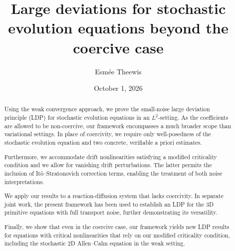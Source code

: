\documentclass{amsart}
\newcommand{\<}{\langle}
\newcommand{\?}{\rangle}
\theoremstyle{plain}
\theoremstyle{remark}
\theoremstyle{plain}
\numberwithin{equation}{section}
\begin{document}
\author[Esm\'ee Theewis]{Esm\'ee Theewis}
\address[E. Theewis]{Delft Institute of Applied Mathematics\\
Delft University of Technology \\ P.O. Box 5031\\ 2600 GA Delft\\The
Netherlands}


\date{October 1, 2026}

\title[Large deviations beyond the coercive case]{Large deviations for stochastic evolution equations beyond the coercive case}  




\begin{abstract} 
Using the weak convergence approach, we prove the small-noise large deviation principle (LDP) for stochastic evolution equations in an $L^2$-setting. As the coefficients are allowed to be non-coercive, our framework encompasses a much broader scope than variational settings. In place of coercivity, we require only well-posedness of the stochastic evolution equation and two concrete, verifiable a priori estimates. 

Furthermore, we accommodate drift nonlinearities satisfying a modified criticality condition and we allow for vanishing drift perturbations. The latter permits the inclusion of It\^o--Stratonovich correction terms, enabling the treatment of both noise interpretations.  

We apply our results to a reaction-diffusion system that lacks coercivity. In separate joint work, the present framework has been used to establish an LDP for the 3D primitive equations with full transport noise, further demonstrating its versatility. 

Finally, we show that even in the coercive case, our framework yields new LDP results for equations with critical nonlinearities that rely on our modified criticality condition, including the stochastic 2D Allen--Cahn equation in the weak setting.
\end{abstract}

\maketitle
{}
\end{document}

